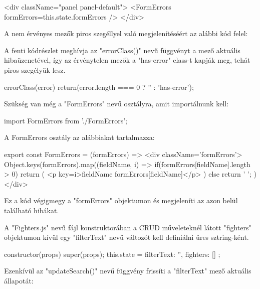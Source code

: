\begin{cpp}
<div className="panel panel-default">
	<FormErrors formErrors={this.state.formErrors} />
</div>
\end{cpp}

A nem érvényes mezők piros szegéllyel való megjelenítéséért az alábbi kód felel:


A fenti kódrészlet meghívja az "errorClass()" nevű függvényt a mező aktuális hibaüzenetével, így az érvénytelen mezők a "has-error" class-t kapják meg, tehát piros szegélyük lesz.

\begin{cpp}
errorClass(error) {
    return(error.length === 0 ? '' : 'has-error');}
\end{cpp}

Szükség van még a "FormErrors" nevű osztályra, amit importálnunk kell:

\begin{cpp}
import { FormErrors } from './FormErrors';
\end{cpp}

A FormErrors osztály az alábbiakat tartalmazza:

\begin{cpp}
export const FormErrors = ({formErrors}) =>
  <div className='formErrors'>
    {Object.keys(formErrors).map((fieldName, i) => {
      if(formErrors[fieldName].length > 0){
        return (
          <p key={i}>{fieldName} {formErrors[fieldName]}</p>
        )        
      } else {
        return ' ';
      } })} </div>
\end{cpp}

Ez a kód végigmegy a "formErrors" objektumon és megjeleníti az azon belül található hibákat.


A "Fighters.js" nevű fájl konstruktorában a CRUD műveleteknél látott "fighters" objektumon kívül egy "filterText" nevű változót kell definiálni üres sztring-ként.

\begin{cpp}
constructor(props) {
    super(props);
    this.state = {
      filterText: '',
      fighters: []
    };
  }
\end{cpp}

Ezenkívül az "updateSearch()" nevű függvény frissíti a "filterText" mező aktuális állapotát:

